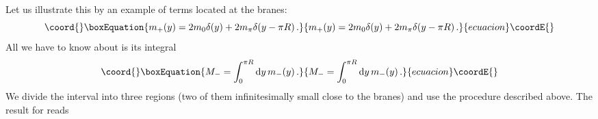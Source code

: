 \documentclass[a4paper,12pt]{article}
\def\de{\delta}
\def\d{{\rm d}}
\def\bu{{\bf u}}
\begin{document}
Let us illustrate this by an example of \coordHE{} terms located at the
branes: 
\begin{equation}\coord{}\boxEquation{
m_+(y)
=
2m_0\de(y)+2m_\pi\de(y-\pi R)
\,.
}{
m_+(y)
=
2m_0\de(y)+2m_\pi\de(y-\pi R)
\,.
}{ecuacion}\coordE{}\end{equation}
All we have to know about \coordHE{} is its integral
\begin{equation}\coord{}\boxEquation{
M_-=\int_0^{\pi R}\d y\,m_-(y)
\,.
}{
M_-=\int_0^{\pi R}\d y\,m_-(y)
\,.
}{ecuacion}\coordE{}\end{equation}
We divide the interval \myHighlight{$[0,\pi R]$}\coordHE{} into three regions (two of them
infinitesimally small close to the branes) and use the procedure
described above. The result for \myHighlight{$\bu_0(\pi R)$}\coordHE{} reads
\end{document}
